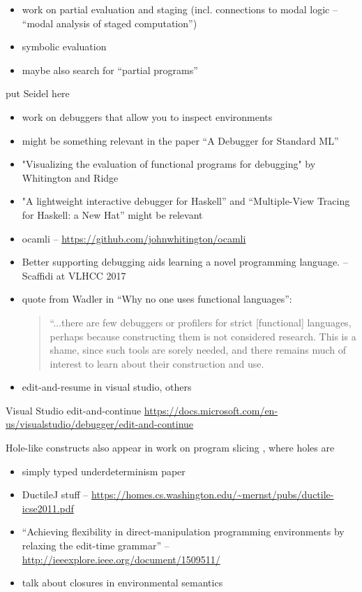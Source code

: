 
\begin{itemize}
	\item work on partial evaluation and staging (incl. connections to modal logic -- ``modal analysis of staged computation'')
	\item symbolic evaluation
	\item maybe also search for ``partial programs'' 
\end{itemize}

put Seidel here


\begin{itemize}
	\item work on debuggers that allow you to inspect environments
  \item might be something relevant in the paper ``A Debugger for Standard ML'' 
  \item "Visualizing the evaluation of functional programs for debugging" by Whitington and Ridge
  \item "A lightweight interactive debugger for Haskell'' and ``Multiple-View Tracing for Haskell: a New Hat'' might be relevant
  \item ocamli -- \url{https://github.com/johnwhitington/ocamli}
  \item Better supporting debugging aids learning a novel programming language. -- Scaffidi at VLHCC 2017
  \item quote from Wadler in ``Why no one uses functional languages'':
    \begin{quote}
    “...there are few debuggers or
profilers for strict [functional] languages, perhaps because constructing them is not considered
research. This is a shame, since such tools are sorely needed, and there remains much of
interest to learn about their construction and use.
    \end{quote}
   \item edit-and-resume in visual studio, others
\end{itemize}

Visual Studio edit-and-continue \url{https://docs.microsoft.com/en-us/visualstudio/debugger/edit-and-continue}

Hole-like constructs also appear in work on program slicing
\cite{DBLP:conf/icfp/PereraACL12}, where holes are 


\begin{itemize}
	\item simply typed underdeterminism paper
	\item DuctileJ stuff -- \url{https://homes.cs.washington.edu/~mernst/pubs/ductile-icse2011.pdf}
	\item ``Achieving flexibility in direct-manipulation programming environments by relaxing the edit-time grammar'' -- \url{http://ieeexplore.ieee.org/document/1509511/}
	\item talk about closures in environmental semantics
\end{itemize}
